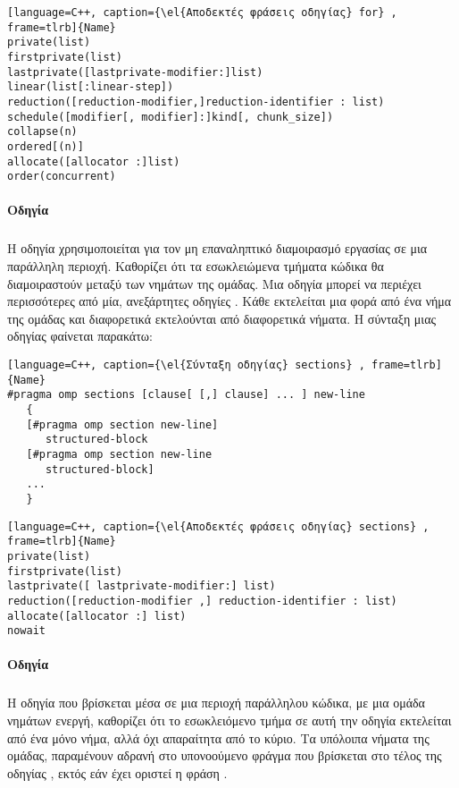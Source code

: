 \begin{lstlisting}[language=C++, caption={\el{Αποδεκτές φράσεις οδηγίας} for} , frame=tlrb]{Name}
private(list)
firstprivate(list)
lastprivate([lastprivate-modifier:]list)
linear(list[:linear-step])
reduction([reduction-modifier,]reduction-identifier : list)
schedule([modifier[, modifier]:]kind[, chunk_size])
collapse(n)
ordered[(n)]
allocate([allocator :]list)
order(concurrent)
\end{lstlisting}


\paragraph{Οδηγία }
\subparagraph{}
Η οδηγία \emph{} χρησιμοποιείται για τον μη επαναληπτικό διαμοιρασμό εργασίας σε μια παράλληλη περιοχή. Καθορίζει ότι τα εσωκλειώμενα τμήματα κώδικα θα διαμοιραστούν μεταξύ των νημάτων της ομάδας. Μια οδηγία \emph{} μπορεί να περιέχει περισσότερες από μία, ανεξάρτητες οδηγίες \emph{}. Κάθε \emph{} εκτελείται μια φορά από ένα νήμα της ομάδας και διαφορετικά \emph{} εκτελούνται από διαφορετικά νήματα. Η σύνταξη μιας οδηγίας \emph{} φαίνεται παρακάτω\cite{pdplab}:

\begin{lstlisting}[language=C++, caption={\el{Σύνταξη οδηγίας} sections} , frame=tlrb]{Name}
#pragma omp sections [clause[ [,] clause] ... ] new-line 
   { 
   [#pragma omp section new-line] 
      structured-block 
   [#pragma omp section new-line 
      structured-block] 
   ... 
   }
\end{lstlisting}
\clearpage
\begin{lstlisting}[language=C++, caption={\el{Αποδεκτές φράσεις οδηγίας} sections} , frame=tlrb]{Name}
private(list) 
firstprivate(list) 
lastprivate([ lastprivate-modifier:] list) 
reduction([reduction-modifier ,] reduction-identifier : list) 
allocate([allocator :] list) 
nowait
\end{lstlisting}

\paragraph{Οδηγία }
\subparagraph{}
Η οδηγία \emph{} που βρίσκεται μέσα σε μια περιοχή παράλληλου κώδικα, με μια ομάδα νημάτων ενεργή, καθορίζει ότι το εσωκλειόμενο τμήμα σε αυτή την οδηγία εκτελείται από ένα μόνο νήμα, αλλά όχι απαραίτητα από το κύριο. Τα υπόλοιπα νήματα της ομάδας, παραμένουν αδρανή στο υπονοούμενο φράγμα που βρίσκεται στο τέλος της οδηγίας \emph{}, εκτός εάν έχει οριστεί η φράση \emph{}\cite{openmpse16}.

